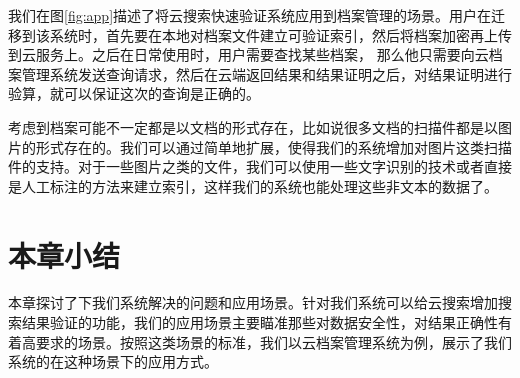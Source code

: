 我们在图\ref{fig:app}描述了将云搜索快速验证系统应用到档案管理的场景。用户在迁移到该系统时，首先要在本地对档案文件建立可验证索引，然后将档案加密再上传到云服务上。之后在日常使用时，用户需要查找某些档案，
那么他只需要向云档案管理系统发送查询请求，然后在云端返回结果和结果证明之后，对结果证明进行验算，就可以保证这次的查询是正确的。

考虑到档案可能不一定都是以文档的形式存在，比如说很多文档的扫描件都是以图片的形式存在的。我们可以通过简单地扩展，使得我们的系统增加对图片这类扫描件的支持。对于一些图片之类的文件，我们可以使用一些文字识别的技术或者直接是人工标注的方法来建立索引，这样我们的系统也能处理这些非文本的数据了。

\section{本章小结}
本章探讨了下我们系统解决的问题和应用场景。针对我们系统可以给云搜索增加搜索结果验证的功能，我们的应用场景主要瞄准那些对数据安全性，对结果正确性有着高要求的场景。按照这类场景的标准，我们以云档案管理系统为例，展示了我们系统的在这种场景下的应用方式。
